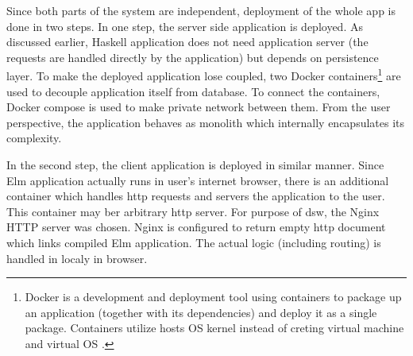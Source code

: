 Since both parts of the system are independent, deployment of the whole app is done in two steps.
In one step, the server side application is deployed.
As discussed earlier, Haskell application does not need application server (the requests are handled directly by the application) but depends on persistence layer.
To make the deployed application lose coupled, two Docker containers\footnote{Docker is a development and deployment tool using containers to package up an application (together with its dependencies) and deploy it as a single package. Containers utilize hosts OS kernel instead of creting virtual machine and virtual OS \cite{ms-docker}.} are used to decouple application itself from database.
To connect the containers, Docker compose is used to make private network between them.
From the user perspective, the application behaves as monolith which internally encapsulates its complexity.

In the second step, the client application is deployed in similar manner.
Since Elm application actually runs in user's internet browser, there is an additional container which handles \gls{http} requests and servers the application to the user.
This container may ber arbitrary \gls{http} server.
For purpose of \gls{dsw}, the Nginx HTTP server was chosen.
Nginx is configured to return empty \gls{http} document which links compiled Elm application.
The actual logic (including routing) is handled in localy in browser.

